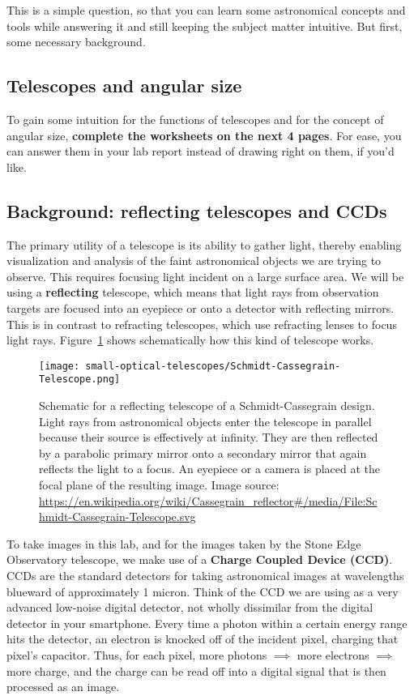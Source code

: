 This is a simple question, so that you can learn some astronomical concepts and tools while answering it and still keeping the subject matter intuitive. But first, some necessary background.

\subsection{Telescopes and angular size}

To gain some intuition for the functions of telescopes and for the concept of angular size, \textbf{complete the worksheets on the next 4 pages}. For ease, you can answer them in your lab report instead of drawing right on them, if you'd like.



\subsection{Background: reflecting telescopes and CCDs}

The primary utility of a telescope is its ability to gather light, thereby enabling visualization and analysis of the faint astronomical objects we are trying to observe. This requires focusing light incident on a large surface area. We will be using a \textbf{reflecting} telescope, which means that light rays from observation targets are focused into an eyepiece or onto a detector with reflecting mirrors. This is in contrast to refracting telescopes, which use refracting lenses to focus light rays. Figure~\ref{sot:fig:schmidt} shows schematically how this kind of telescope works. 

\begin{figure}
	\centering
	\texttt{[image: small-optical-telescopes/Schmidt-Cassegrain-Telescope.png]}
	\caption{Schematic for a reflecting telescope of a Schmidt-Cassegrain design. 
		Light rays from astronomical objects enter the telescope in parallel because their source is effectively at infinity. They are then reflected by a parabolic primary mirror onto a secondary mirror that again reflects the light to a focus. An eyepiece or a camera is placed at the focal plane of the resulting image. Image source: \url{https://en.wikipedia.org/wiki/Cassegrain\_reflector\#/media/File:Schmidt-Cassegrain-Telescope.svg}}\label{sot:fig:schmidt}
\end{figure}

To take images in this lab, %
and for the images taken by the Stone Edge Observatory telescope, %
we make use of a \textbf{Charge Coupled Device (CCD)}. CCDs are the standard detectors for taking astronomical images at wavelengths blueward of approximately 1 micron. Think of the CCD we are using as a
very advanced low-noise digital detector, not wholly dissimilar from the digital detector in your
smartphone. Every time a photon within a certain energy range hits the detector, an electron is knocked off of the incident pixel, charging that pixel's capacitor. Thus, for each pixel, more photons $\implies$ more electrons $\implies$ more charge, and the charge can be read off into a digital signal that is then processed as an image. 

